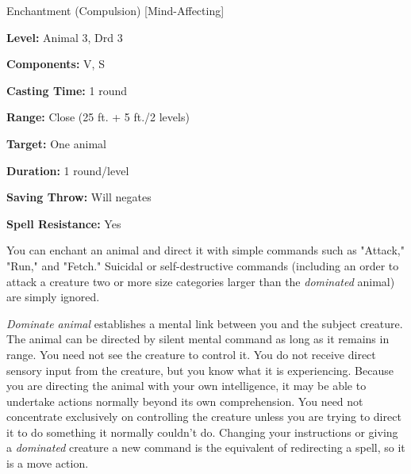 
Enchantment (Compulsion) [Mind-Affecting]

\textbf{Level:} Animal 3, Drd 3

\textbf{Components:} V, S

\textbf{Casting Time:} 1 round

\textbf{Range:} Close (25 ft. + 5 ft./2 levels)

\textbf{Target:} One animal

\textbf{Duration:} 1 round/level

\textbf{Saving Throw:} Will negates

\textbf{Spell Resistance:} Yes

You can enchant an animal and direct it with simple commands such as "Attack," 
"Run," and "Fetch." Suicidal or self-destructive commands (including an order 
to attack a creature two or more size categories larger than the \textit{dominated 
}animal) are simply ignored.

\textit{Dominate animal} establishes a mental link between you and the subject 
creature. The animal can be directed by silent mental command as long as it remains 
in range. You need not see the creature to control it. You do not receive direct 
sensory input from the creature, but you know what it is experiencing. Because 
you are directing the animal with your own intelligence, it may be able to undertake 
actions normally beyond its own comprehension. You need not concentrate exclusively 
on controlling the creature unless you are trying to direct it to do something 
it normally couldn't do. Changing your instructions or giving a \textit{dominated 
}creature a new command is the equivalent of redirecting a spell, so it is a move 
action.

